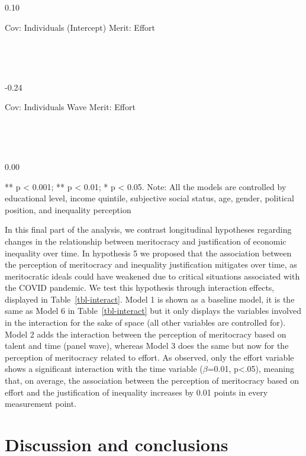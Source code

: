 \documentclass[
]{article}
\begin{document}
\begin{table}
{~

~

0.10

Cov: Individuals (Intercept) Merit: Effort

~

~

-0.24

Cov: Individuals Wave Merit: Effort

~

~

0.00

\item *

** p \textless{} 0.001; ** p \textless{} 0.01; * p \textless{} 0.05.
Note: All the models are controlled by educational level, income
quintile, subjective social status, age, gender, political position, and
inequality perception

}

\end{table}%

In this final part of the analysis, we contrast longitudinal hypotheses
regarding changes in the relationship between meritocracy and
justification of economic inequality over time. In hypothesis 5 we
proposed that the association between the perception of meritocracy and
inequality justification mitigates over time, as meritocratic ideals
could have weakened due to critical situations associated with the COVID
pandemic. We test this hypothesis through interaction effects, displayed
in Table~\ref{tbl-interact}. Model 1 is shown as a baseline model, it is
the same as Model 6 in Table~\ref{tbl-interact} but it only displays the
variables involved in the interaction for the sake of space (all other
variables are controlled for). Model 2 adds the interaction between the
perception of meritocracy based on talent and time (panel wave), whereas
Model 3 does the same but now for the perception of meritocracy related
to effort. As observed, only the effort variable shows a significant
interaction with the time variable (\(\beta\)=0.01, p\textless.05),
meaning that, on average, the association between the perception of
meritocracy based on effort and the justification of inequality
increases by 0.01 points in every measurement point.

\section{Discussion and conclusions}\label{discussion-and-conclusions}
\end{document}

